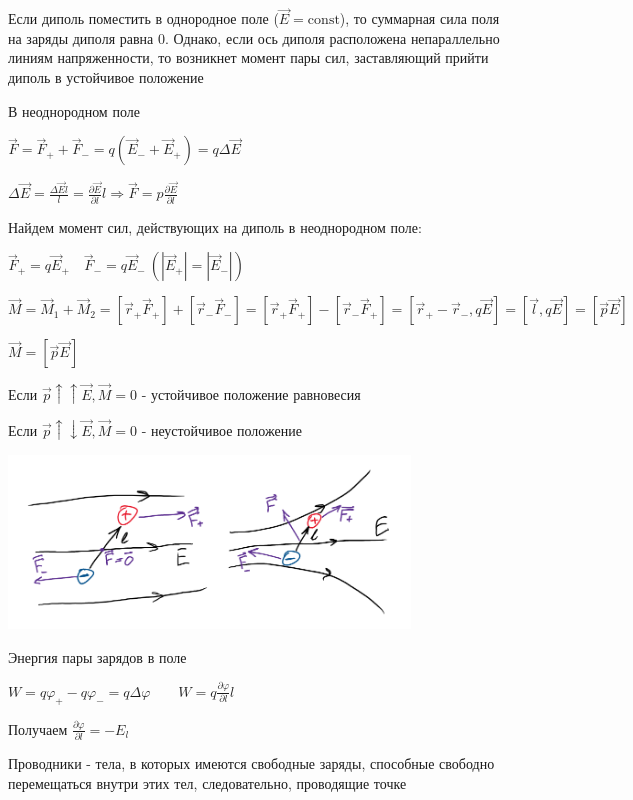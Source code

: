 \documentclass[12pt]{article}
\begin{document}
 Если диполь поместить в однородное поле ($\vec{E} = \mathrm{const}$), то суммарная сила поля на заряды диполя равна 0.
Однако, если ось диполя расположена непараллельно линиям напряженности, то возникнет момент пары сил, заставляющий прийти диполь в устойчивое положение

 В неоднородном поле

$\vec{F} = \vec{F}_+ + \vec{F}_- = q(\vec{E}_- + \vec{E}_+) = q\Delta\vec{E}$

$\Delta\vec{E} = \frac{\Delta\vec{E}l}{l} = \frac{\partial \vec{E}}{\partial l}l \Longrightarrow \vec{F} = p\frac{\partial \vec{E}}{\partial l}$

Найдем момент сил, действующих на диполь в неоднородном поле:

$\vec{F}_+ = q\vec{E}_+ \quad \vec{F}_- = q\vec{E}_- \ (|\vec{E}_+| = |\vec{E}_-|)$

$\vec{M} = \vec{M}_1 + \vec{M}_2 = [\vec{r}_+ \vec{F}_+] + [\vec{r}_- \vec{F}_-] = [\vec{r}_+ \vec{F}_+] - [\vec{r}_- \vec{F}_+] = 
[\vec{r}_+ - \vec{r}_-, q\vec{E}] = [\vec{l}, q\vec{E}] = [\vec{p}\vec{E}]$

$\vec{M} = [\vec{p}\vec{E}]$

Если $\vec{p} \uparrow\uparrow \vec{E}, \vec{M} = 0$ - устойчивое положение равновесия

Если $\vec{p} \uparrow\downarrow \vec{E}, \vec{M} = 0$ - неустойчивое положение

\begin{center}
    \includegraphics[width=0.8\textwidth]{physics1/images/physics1_2024_12_02_3}
\end{center}


Энергия пары зарядов в поле

$W = q \varphi_+ - q\varphi_- = q\Delta\varphi \qquad W = q\frac{\partial \varphi}{\partial l}l$

Получаем $\frac{\partial \varphi}{\partial l} = -E_l$

\Def Проводники - тела, в которых имеются свободные заряды, способные свободно перемещаться внутри этих тел, следовательно,
проводящие точке
\end{document}
